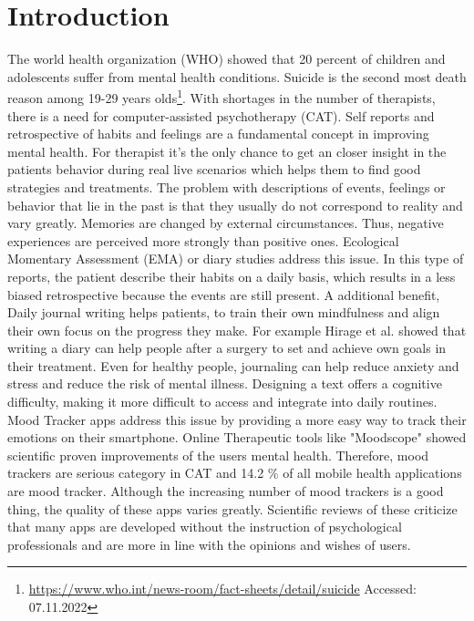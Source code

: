 \chapter{Introduction}
\label{ch:introduction}
The world health organization (WHO) showed that 20 percent of children and adolescents suffer from mental health conditions. Suicide is the second most death reason among 19-29 years olds\footnote{\url{https://www.who.int/news-room/fact-sheets/detail/suicide} Accessed: 07.11.2022}.
With shortages in the number of therapists, there is a need for computer-assisted psychotherapy (CAT). 
Self reports and retrospective of habits and feelings are a fundamental concept in improving mental health.
For therapist it's the only chance to get an closer insight in the patients behavior during real live scenarios which helps them to find good strategies and treatments.
The problem with descriptions of events, feelings or behavior that lie in the past is that they usually do not correspond to reality and vary greatly. 
Memories are changed by external circumstances. Thus, negative experiences are perceived more strongly than positive ones\cite{bradburn1987answering}.
Ecological Momentary Assessment (EMA) or diary studies address this issue\cite{shiffman2008ecological}.
In this type of reports, the patient describe their habits on a daily basis, which results in a less biased retrospective because the events are still present.
A additional benefit, Daily journal writing helps patients, to train their own mindfulness and align their own focus on the progress they make. For example Hirage et al. showed that writing a diary can help people after a surgery to set and achieve own goals in their treatment\cite{hiraga2019effects}.
Even for healthy people, journaling can help reduce anxiety and stress and reduce the risk of mental illness.
Designing a text offers a cognitive difficulty, making it more difficult to access and integrate into daily routines.
Mood Tracker apps address this issue by providing a more easy way to track their emotions on their smartphone. 
Online Therapeutic tools like "Moodscope" showed scientific proven improvements of the users mental health\cite{drake2013assessing}. Therefore, mood trackers are serious category in CAT and 14.2 \% of all mobile health applications are mood tracker.
Although the increasing number of mood trackers is a good thing, the quality of these apps varies greatly. 
Scientific reviews of these criticize that many apps are developed without the instruction of psychological professionals and are more in line with the opinions and wishes of users\cite{caldeira_mobile_nodate}\cite{schueller2021understanding}.
